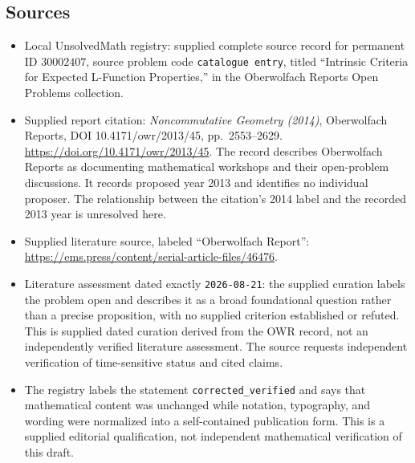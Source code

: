 \documentclass[11pt]{article}
\begin{document}
\subsection{Sources}
\begin{itemize}
\item Local UnsolvedMath registry: supplied complete source record for permanent ID \(30002407\), source problem code \texttt{catalogue entry}, titled ``Intrinsic Criteria for Expected L-Function Properties,'' in the Oberwolfach Reports Open Problems collection.
\item Supplied report citation: \emph{Noncommutative Geometry (2014)}, Oberwolfach Reports, DOI 10.4171/owr/2013/45, pp.\ 2553--2629. \url{https://doi.org/10.4171/owr/2013/45}. The record describes Oberwolfach Reports as documenting mathematical workshops and their open-problem discussions. It records proposed year 2013 and identifies no individual proposer. The relationship between the citation's 2014 label and the recorded 2013 year is unresolved here.
\item Supplied literature source, labeled ``Oberwolfach Report'': \url{https://ems.press/content/serial-article-files/46476}.
\item Literature assessment dated exactly \texttt{2026-08-21}: the supplied curation labels the problem open and describes it as a broad foundational question rather than a precise proposition, with no supplied criterion established or refuted. This is supplied dated curation derived from the OWR record, not an independently verified literature assessment. The source requests independent verification of time-sensitive status and cited claims.
\item The registry labels the statement \texttt{corrected\_verified} and says that mathematical content was unchanged while notation, typography, and wording were normalized into a self-contained publication form. This is a supplied editorial qualification, not independent mathematical verification of this draft.
\end{itemize}
\end{document}
